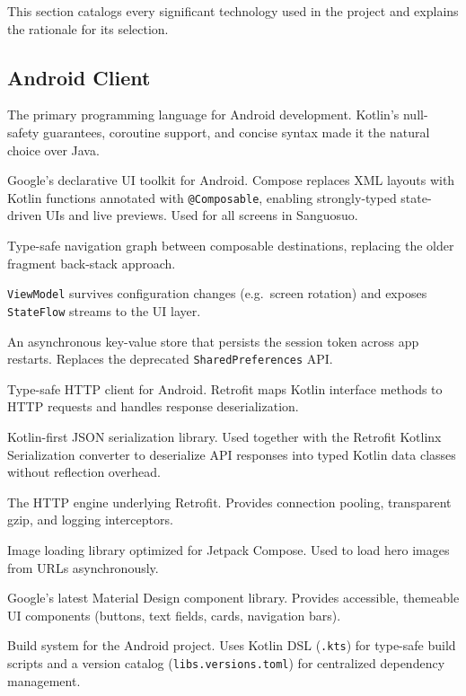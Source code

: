 This section catalogs every significant technology used in the project and explains the rationale for its selection.

\subsection{Android Client}

\begin{description}[leftmargin=2.2cm, style=nextline]
  \item[Kotlin] The primary programming language for Android development. Kotlin's null-safety guarantees, coroutine support, and concise syntax made it the natural choice over Java.
  \item[Jetpack Compose] Google's declarative UI toolkit for Android. Compose replaces XML layouts with Kotlin functions annotated with \texttt{@Composable}, enabling strongly-typed state-driven UIs and live previews. Used for all screens in Sanguosuo.
  \item[Jetpack Navigation Compose] Type-safe navigation graph between composable destinations, replacing the older fragment back-stack approach.
  \item[Jetpack Lifecycle / ViewModel] \texttt{ViewModel} survives configuration changes (e.g.\ screen rotation) and exposes \texttt{StateFlow} streams to the UI layer.
  \item[Jetpack DataStore Preferences] An asynchronous key-value store that persists the session token across app restarts. Replaces the deprecated \texttt{SharedPreferences} API.
  \item[Retrofit 2] Type-safe HTTP client for Android. Retrofit maps Kotlin interface methods to HTTP requests and handles response deserialization.
  \item[Kotlinx Serialization] Kotlin-first JSON serialization library. Used together with the Retrofit Kotlinx Serialization converter to deserialize API responses into typed Kotlin data classes without reflection overhead.
  \item[OkHttp] The HTTP engine underlying Retrofit. Provides connection pooling, transparent gzip, and logging interceptors.
  \item[Coil Compose] Image loading library optimized for Jetpack Compose. Used to load hero images from URLs asynchronously.
  \item[Material 3] Google's latest Material Design component library. Provides accessible, themeable UI components (buttons, text fields, cards, navigation bars).
  \item[Gradle (Kotlin DSL)] Build system for the Android project. Uses Kotlin DSL (\texttt{.kts}) for type-safe build scripts and a version catalog (\texttt{libs.versions.toml}) for centralized dependency management.
\end{description}

